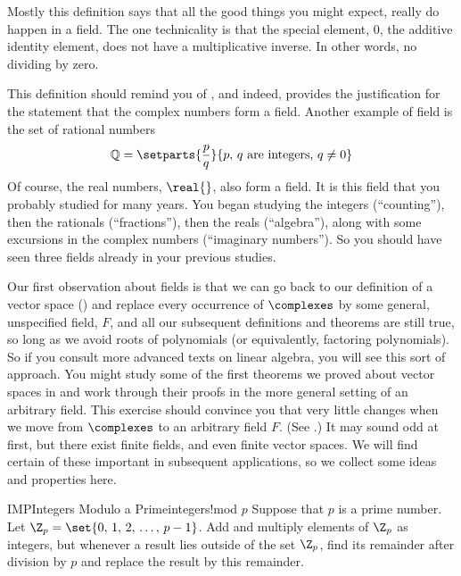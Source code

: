 %
Mostly this definition says that all the good things you might expect, really do happen in a field.  The one technicality is that the special element, $0$, the additive identity element, does not have a multiplicative inverse.  In other words, no dividing by zero.\par
%
This definition should remind you of , and indeed,  provides the justification for the statement that the complex numbers form a field.  Another example of field is the set of rational numbers
%
\begin{align*}
{\mathbb Q}=\setparts{\frac{p}{q}}{p,\,q\text{ are integers, }q\neq 0}
\end{align*}
%
Of course, the real numbers, $\real{\null}$, also form a field.  It is this field that you probably studied for many years.  You began studying the integers (``counting''), then the rationals (``fractions''), then the reals (``algebra''), along with some excursions in the complex numbers (``imaginary numbers'').  So you should have seen three fields already in your previous studies.\par
%
Our first observation about fields is that we can go back to our definition of a vector space () and replace every occurrence of $\complexes$ by some general, unspecified field, $F$, and all our subsequent definitions and theorems are still true, so long as we avoid roots of polynomials (or equivalently, factoring polynomials).  So if you consult more advanced texts on linear algebra, you will see this sort of approach.  You might study some of the first theorems we proved about vector spaces in  and work through their proofs in the more general setting of an arbitrary field.  This exercise should convince you that very little changes when we move from $\complexes$ to an arbitrary field $F$.  (See .)
%
%
It may sound odd at first, but there exist finite fields, and even finite vector spaces.  We will find certain of these important in subsequent applications, so we collect some ideas and properties here.
%
\begin{definition}{IMP}{Integers Modulo a Prime}{integers!mod $p$}
Suppose that $p$ is a prime number.  Let $\Z_p=\set{0,\,1,\,2,\,\dots,\,p-1}$.  Add and multiply elements of $\Z_p$ as integers, but whenever a result lies outside of the set $\Z_p$, find its remainder after division by $p$ and replace the result by this remainder.
\end{definition}
